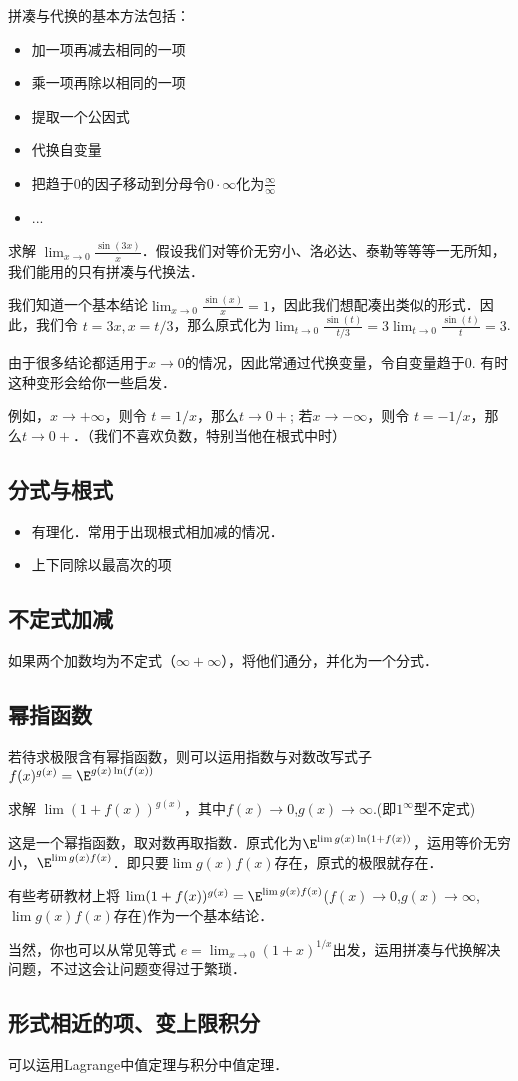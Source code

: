 拼凑与代换的基本方法包括：
\begin{itemize}
\item 加一项再减去相同的一项
\item 乘一项再除以相同的一项
\item 提取一个公因式
\item 代换自变量
\item 把趋于0的因子移动到分母令$0\cdot\infty$化为$\frac{\infty}{\infty}$
\item ...
\end{itemize}

\begin{example}{}
求解 $\lim_{x \to 0} \frac{\sin(3x)}{x}$．假设我们对等价无穷小、洛必达、泰勒等等等一无所知，我们能用的只有拼凑与代换法．

我们知道一个基本结论$\lim_{x \to 0} \frac{\sin(x)}{x}=1$，因此我们想配凑出类似的形式．因此，我们令 $t=3x, x=t/3$，那么原式化为$\lim_{t \to 0} \frac{\sin(t)}{t/3}=3\lim_{t \to 0} \frac{\sin(t)}{t}=3$.
\end{example}

\begin{example}{}
由于很多结论都适用于$x\to0$的情况，因此常通过代换变量，令自变量趋于0. 有时这种变形会给你一些启发．

例如，$x\to+\infty$，则令 $t=1/x$，那么$t\to0+$; 若$x\to-\infty$，则令 $t=-1/x$，那么$t\to0+$．（我们不喜欢负数，特别当他在根式中时）
\end{example}

\subsection{分式与根式}
\begin{itemize}
\item 有理化．常用于出现根式相加减的情况．
\item 上下同除以最高次的项
\end{itemize}

\subsection{不定式加减}
如果两个加数均为不定式（$\infty+\infty$），将他们通分，并化为一个分式．

\subsection{幂指函数}
若待求极限含有幂指函数，则可以运用指数与对数改写式子 $f(x)^{g(x)}=\E^{g(x)\ln(f(x))}$
\begin{example}{}
求解 $\lim (1+f(x))^{g(x)}$，其中$f(x)\to0$,$g(x)\to\infty$.(即$1^\infty$型不定式)

这是一个幂指函数，取对数再取指数．原式化为$\E^{\lim g(x) \ln (1+f(x))}$，运用等价无穷小，$\E^{\lim g(x) f(x)}$．即只要$\lim g(x) f(x)$存在，原式的极限就存在．

有些考研教材上将 $\lim (1+f(x))^{g(x)} = \E^{\lim g(x) f(x) }$($f(x)\to0$,$g(x)\to\infty$,$\lim g(x) f(x)$存在)作为一个基本结论．

当然，你也可以从常见等式 $e=\lim_{x\to0} (1+x)^{1/x}$出发，运用拼凑与代换解决问题，不过这会让问题变得过于繁琐．
\end{example}

\subsection{形式相近的项、变上限积分}
可以运用Lagrange中值定理与积分中值定理．